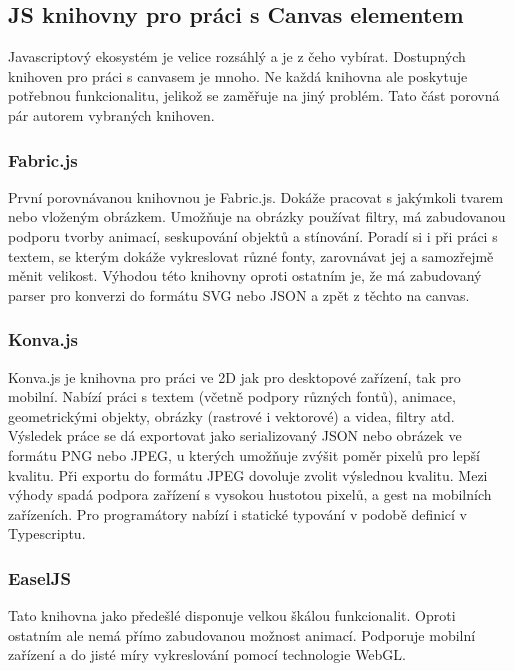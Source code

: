         \subsection{JS knihovny pro práci s Canvas elementem}
        Javascriptový ekosystém je velice rozsáhlý a je z čeho vybírat. Dostupných knihoven pro práci s canvasem je mnoho.
        Ne každá knihovna ale poskytuje potřebnou funkcionalitu,
        jelikož se zaměřuje na jiný problém. Tato část porovná pár autorem vybraných knihoven.

            \subsubsection{Fabric.js}
            První porovnávanou knihovnou je Fabric.js. Dokáže pracovat s jakýmkoli tvarem nebo vloženým obrázkem. Umožňuje na obrázky používat filtry,
            má zabudovanou podporu tvorby animací, seskupování objektů a stínování. Poradí si i při práci s textem, se kterým dokáže vykreslovat různé fonty,
            zarovnávat jej a samozřejmě měnit velikost.
            Výhodou této knihovny oproti ostatním je, že má zabudovaný parser pro konverzi do formátu SVG nebo JSON a zpět z těchto na canvas.  
            
            \subsubsection{Konva.js}
            Konva.js je knihovna pro práci ve 2D jak pro desktopové zařízení, tak pro mobilní. Nabízí práci s textem (včetně podpory různých fontů),
            animace, geometrickými objekty, obrázky (rastrové i vektorové) a videa, filtry atd. Výsledek práce se dá exportovat jako serializovaný
            JSON nebo obrázek ve formátu PNG nebo JPEG, u kterých umožňuje zvýšit poměr pixelů pro lepší kvalitu.
            Při exportu do formátu JPEG dovoluje zvolit výslednou kvalitu. Mezi výhody spadá podpora zařízení s vysokou hustotou pixelů, a gest na mobilních zařízeních.
            Pro programátory nabízí i statické typování v podobě definicí v Typescriptu. 

            \subsubsection{EaselJS}
            Tato knihovna jako předešlé disponuje velkou škálou funkcionalit.
            Oproti ostatním ale nemá přímo zabudovanou možnost animací.
            Podporuje mobilní zařízení a do jisté míry vykreslování pomocí technologie WebGL.

